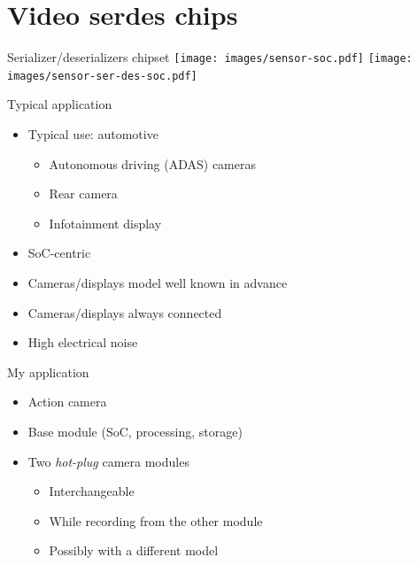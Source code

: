 \documentclass[xetex,table,aspectratio=169]{beamer}
\begin{document}
\section{Video serdes chips}

\begin{frame}{Serializer/deserializers chipset}
  \center\texttt{[image: images/sensor-soc.pdf]}
  \pause
  \center\texttt{[image: images/sensor-ser-des-soc.pdf]}
\end{frame}

\begin{frame}{Typical application}
  \begin{itemize}
  \item Typical use: automotive
    \begin{itemize}
    \item Autonomous driving (ADAS) cameras
    \item Rear camera
    \item Infotainment display
    \end{itemize}
  \item SoC-centric
  \item Cameras/displays model well known in advance
  \item Cameras/displays always connected
  \item High electrical noise
  \end{itemize}
\end{frame}

\begin{frame}{My application}
  \begin{itemize}
  \item Action camera
  \item Base module (SoC, processing, storage)
  \item Two {\em hot-plug} camera modules
    \begin{itemize}
    \item Interchangeable
    \item While recording from the other module
    \item Possibly with a different model
    \end{itemize}
  \end{itemize}
\end{frame}
\end{document}
